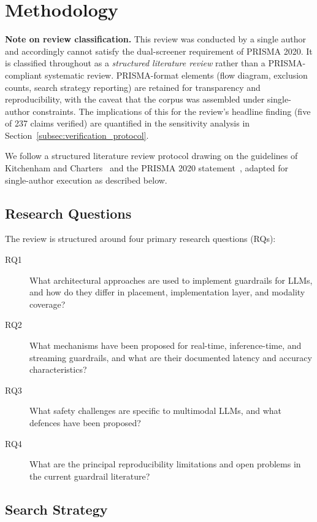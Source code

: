 \section{Methodology}
\label{sec:methodology}

\noindent\textbf{Note on review classification.}
This review was conducted by a single author and accordingly cannot satisfy the dual-screener requirement of PRISMA 2020.
It is classified throughout as a \emph{structured literature review} rather than a PRISMA-compliant systematic review.
PRISMA-format elements (flow diagram, exclusion counts, search strategy reporting) are retained for transparency and reproducibility, with the caveat that the corpus was assembled under single-author constraints.
The implications of this for the review's headline finding (five of 237 claims verified) are quantified in the sensitivity analysis in Section~\ref{subsec:verification_protocol}.

We follow a structured literature review protocol drawing on the guidelines of
Kitchenham and Charters~\cite{kitchenham2007guidelines} and the PRISMA 2020
statement~\cite{page2021prisma}, adapted for single-author execution as described below.

\subsection{Research Questions}

The review is structured around four primary research questions (RQs):

\begin{description}
  \item[RQ1] What architectural approaches are used to implement guardrails for LLMs,
             and how do they differ in placement, implementation layer, and modality
             coverage?
  \item[RQ2] What mechanisms have been proposed for real-time, inference-time, and
             streaming guardrails, and what are their documented latency and accuracy
             characteristics?
  \item[RQ3] What safety challenges are specific to multimodal LLMs, and what
             defences have been proposed?
  \item[RQ4] What are the principal reproducibility limitations and open problems
             in the current guardrail literature?
\end{description}

\subsection{Search Strategy}

